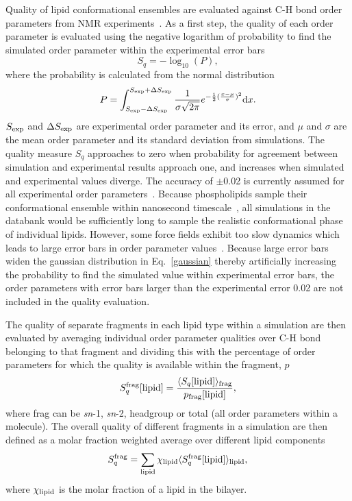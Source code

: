 \documentclass[fleqn,10pt]{wlscirep}
\begin{document}
Quality of lipid conformational ensembles are evaluated against C-H bond order parameters from NMR experiments~\cite{ollila16}. As a first step, the quality of each order parameter is evaluated using the negative logarithm of probability to find the simulated order parameter within the experimental error bars
\begin{equation}
    S_q = -\log_{10}(P),    
\end{equation}
where the probability is calculated from the normal distribution
\begin{equation}\label{gaussian}
    P = \int_{S_{\rm exp}-\Delta S_{\rm exp}}^{S_{\rm exp}+
    \Delta S_{\rm exp}}  \frac{1}{\sigma \sqrt{2\pi}} e^{-\frac{1}{2}(\frac{x-\mu}{\sigma})^2} {\rm d}x.
\end{equation}
$S_{\rm exp}$ and $\Delta S_{\rm exp}$ are experimental order parameter and its error, and $\mu$ and $\sigma$ are the mean order parameter and its standard deviation from simulations. The quality measure $S_q$ approaches to zero when probability for agreement between simulation and experimental results approach one, and increases when simulated and experimental values diverge. The accuracy of $\pm$0.02 is currently assumed for all experimental order parameters~\cite{ollila16}. Because phospholipids sample their conformational ensemble within nanosecond timescale~\cite{ferreira15}, all simulations in the databank would be sufficiently long to sample the realistic conformational phase of individual lipids. However, some force fields exhibit too slow dynamics which leads to large error bars in order parameter values~\cite{antila21a}. Because large error bars widen the gaussian distribution in Eq.~\ref{gaussian} thereby artificially increasing the probability to find the simulated value within experimental error bars, the order parameters with error bars larger than the experimental error 0.02 are not included in the quality evaluation.

The quality of separate fragments in each lipid type within a simulation are then evaluated by averaging individual order parameter qualities over C-H bond belonging to that fragment and dividing this with the percentage of order parameters for which the quality is available within the fragment, $p$
\begin{equation}
    S_q^{\rm frag}[{\rm lipid}] = \frac{\langle S_q[{\rm lipid}]\rangle_{\rm frag}}{p_{\rm frag}[{\rm lipid}]},
\end{equation}
 where frag can be {\it sn}-1, {\it sn}-2, headgroup or total (all order parameters within a molecule). The overall quality of different fragments in a simulation are then defined as a molar fraction weighted average over different lipid components
\begin{equation}
    S_q^{\rm frag} = \sum_{\rm lipid} \chi_{\rm lipid} \langle S_q^{\rm frag}[{\rm lipid}]\rangle_{\rm lipid} ,
\end{equation}
where $\chi_{\rm lipid}$ is the molar fraction of a lipid in the bilayer.
\end{document}
